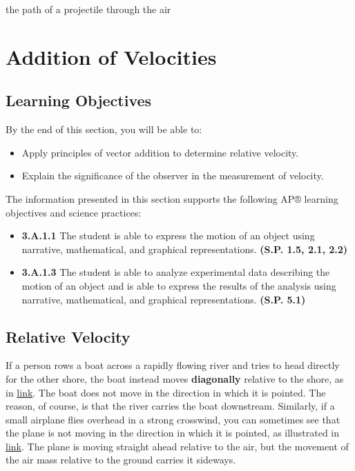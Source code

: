 \documentclass[
]{book}
\providecommand{\tightlist}{%
  \setlength{\itemsep}{0pt}\setlength{\parskip}{0pt}}
\begin{document}
\begin{description}
\tightlist
\item[trajectory]
the path of a projectile through the air
\end{description}

\hypertarget{addition-of-velocities}{%
\section{Addition of Velocities}\label{addition-of-velocities}}

\hypertarget{fs-id1524943}{}
\hypertarget{learning-objectives-11}{%
\subsection{Learning Objectives}\label{learning-objectives-11}}

By the end of this section, you will be able to:

\begin{itemize}
\tightlist
\item
  Apply principles of vector addition to determine relative velocity.
\item
  Explain the significance of the observer in the measurement of
  velocity.
\end{itemize}

The information presented in this section supports the following AP®
learning objectives and science practices:

\begin{itemize}
\tightlist
\item
  \textbf{3.A.1.1} The student is able to express the motion of an object
  using narrative, mathematical, and graphical representations.
  \textbf{(S.P. 1.5, 2.1, 2.2)}
\item
  \textbf{3.A.1.3} The student is able to analyze experimental data
  describing the motion of an object and is able to express the
  results of the analysis using narrative, mathematical, and graphical
  representations. \textbf{(S.P. 5.1)}
\end{itemize}

\hypertarget{fs-id1629614}{}
\hypertarget{relative-velocity}{%
\subsection{Relative Velocity}\label{relative-velocity}}

If a person rows a boat across a rapidly flowing river and tries to head
directly for the other shore, the boat instead moves \textbf{diagonally}
relative to the shore, as in
\protect\hyperlink{import-auto-id1635451}{link}. The boat does
not move in the direction in which it is pointed. The reason, of course,
is that the river carries the boat downstream. Similarly, if a small
airplane flies overhead in a strong crosswind, you can sometimes see
that the plane is not moving in the direction in which it is pointed, as
illustrated in \protect\hyperlink{import-auto-id1851600}{link}.
The plane is moving straight ahead relative to the air, but the movement
of the air mass relative to the ground carries it sideways.
\end{document}
